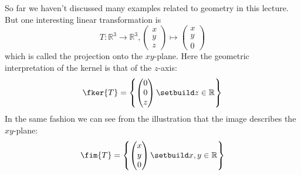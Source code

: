 \begin{exm}\label{exm-linear-map-2d-projection}
	So far we haven't discussed many examples related to geometry in this lecture.
	But one interesting linear transformation is
	\begin{equation}
		T:\mathbb{R}^3\to\mathbb{R}^3,
		\begin{pmatrix}
			x \\ y \\ z
		\end{pmatrix}\mapsto
		\begin{pmatrix}
			x \\ y \\ 0
		\end{pmatrix}
	\end{equation}
	which is called the projection onto the $xy$-plane. Here the geometric
	interpretation of the kernel is that of the $z$-axis:
	\begin{equation*}
		\fker{T}=\left\{\begin{pmatrix}
			0 \\ 0 \\ z
		\end{pmatrix}\setbuild z\in\mathbb{R}\right\}
	\end{equation*}
	In the same fashion we can see from the illustration that the image describes
	the $xy$-plane:
	\begin{equation*}
		\fim{T}=\left\{\begin{pmatrix}
			x \\ y \\ 0
		\end{pmatrix}\setbuild x,y\in\mathbb{R}\right\}
	\end{equation*}
\end{exm}

